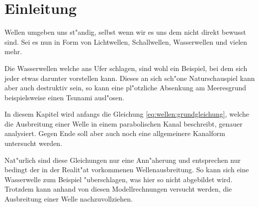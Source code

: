 \section{Einleitung}
Wellen umgeben uns st"andig, selbst wenn wir es uns dem nicht direkt bewusst 
sind. Sei es nun in Form von Lichtwellen, Schallwellen, Wasserwellen und vielen 
mehr.

Die Wasserwellen welche ans Ufer schlagen, sind wohl ein Beispiel, bei dem sich 
jeder etwas darunter vorstellen kann. Dieses an sich sch"one Naturschauspiel 
kann aber auch destruktiv sein, so kann eine pl"otzliche Absenkung am 
Meeresgrund beispielsweise einen Tsunami ausl"osen.

In diesem Kapitel wird anfangs die Gleichung \ref{eq:wellen:grundgleichung}, 
welche die Ausbreitung einer Welle in einem parabolischen Kanal beschreibt, 
genauer analysiert. Gegen Ende soll aber auch noch eine allgemeinere Kanalform 
untersucht werden.

Nat"urlich sind diese Gleichungen nur eine Ann"aherung und entsprechen nur 
bedingt der in der Realit"at vorkommenen Wellenausbreitung. So kann sich eine 
Wasserwelle zum Beispiel "uberschlagen, was hier so nicht abgebildet wird. 
Trotzdem kann anhand von diesen Modellrechnungen versucht werden, die 
Ausbreitung einer Welle nachzuvollziehen.
